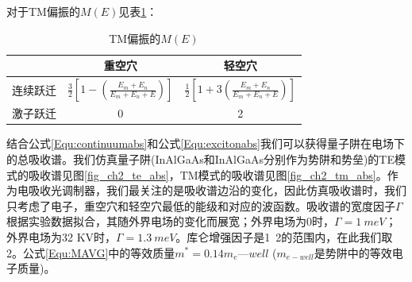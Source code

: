 对于TM偏振的$M(E)$见表\ref{METM}：
{
	\begin{table}[htb]
		\caption{TM偏振的$M(E)$}
		\label{METM}
		\centering
		\begin{tabular}[t]{p{3cm}cc}
			\hline
			& 重空穴 & 轻空穴 \\
			\hline
			连续跃迁  & $\frac{3}{2} \left[ 1- \left( \frac{E_m + E_n}{E_m+E_n+E}\right)\right]$ & $\frac{1}{2} \left[ 1+3 \left( \frac{E_m + E_n}{E_m+E_n+E}\right)\right]$ \\
			激子跃迁  & 0 & 2\\
			\hline
		\end{tabular}
	\end{table}
}

结合公式\ref{Equ:continuumabs}和公式\ref{Equ:excitonabs}我们可以获得量子阱在电场下的总吸收谱。我们仿真量子阱(InAlGaAs和InAlGaAs分别作为势阱和势垒)的TE模式的吸收谱见图\ref{fig_ch2_te_abs}，TM模式的吸收谱见图\ref{fig_ch2_tm_abs}。作为电吸收光调制器，我们最关注的是吸收谱边沿的变化，因此仿真吸收谱时，我们只考虑了电子，重空穴和轻空穴最低的能级和对应的波函数。吸收谱的宽度因子$\Gamma$根据实验数据拟合，其随外界电场的变化而展宽；外界电场为0时，$ \Gamma = 1 ~meV$；外界电场为32 KV时，$ \Gamma = 1.3 ~meV$。库仑增强因子是1~2的范围内\cite{mares1993modeling, chuang1995physics}，在此我们取2。公式\ref{Equ:MAVG}中的等效质量$m^* = 0.14m_e—well$ ($m_{e-well}$是势阱中的等效电子质量)。

